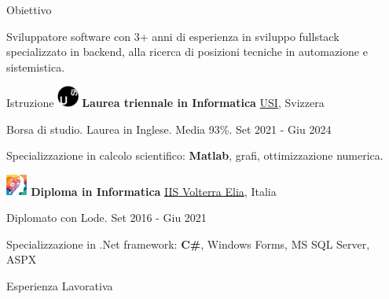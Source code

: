\documentclass{cv} %
\def\intraexpvspace{0.15cm}
\begin{document}
\begin{minipage}[b][0.9\paperheight][t]{0.7\linewidth}

    \headline

    \begin{rSection}{Obiettivo}
        \item Sviluppatore software con 3+ anni di esperienza in sviluppo fullstack
        specializzato in backend,
        alla ricerca di posizioni tecniche in automazione e sistemistica.
    \end{rSection}

    \begin{rSection}{Istruzione}
        \vspace{0.2cm}
        \includegraphics[width=0.7cm, trim={0cm 10cm 0cm 0cm}]{usi-icon.png}
        {\bf Laurea triennale in Informatica}
        \hfill \href{https://www.usi.ch/en}{USI}, Svizzera
        \item \hspace{0.85cm}Borsa di studio. Laurea in Inglese. Media 93\%.
        \hfill {Set 2021 - Giu 2024}
        \item Specializzazione in calcolo scientifico: \textbf{Matlab}, grafi,
        ottimizzazione numerica.
        \vspace{\intraexpvspace}
        \vspace{\intraexpvspace}

        \includegraphics[width=0.7cm, trim={0cm 2.2cm 0cm 0cm}]{iisve-icon.png}
        {\bf Diploma in Informatica}
        \hfill \href{https://www.istitutovolterraelia.it/}{IIS Volterra Elia}, Italia
        \item \hspace{0.85cm}Diplomato con Lode.
        \hfill {Set 2016 - Giu 2021}
        \item Specializzazione in .Net framework: \textbf{C\#}, Windows Forms, MS SQL Server, ASPX
    \end{rSection}
    \begin{rSection}{Esperienza Lavorativa}
        \vspace{0.2cm}


\end{rSection}
\end{minipage}
\end{document}
